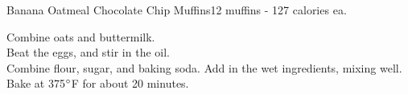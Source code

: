 \begin{recipe}{Banana Oatmeal Chocolate Chip Muffins}{12 muffins - 127 calories ea.}{}


Combine oats and buttermilk.\\

Beat the eggs, and stir in the oil.\\

Combine flour, sugar, and baking soda. Add in the wet ingredients, mixing well.\\

Bake at 375$\degree$F for about 20 minutes.

\end{recipe}